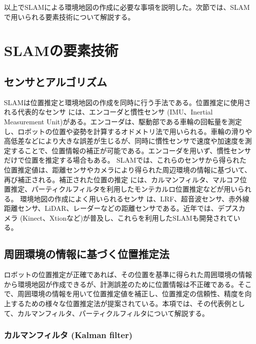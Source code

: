 以上でSLAMによる環境地図の作成に必要な事項を説明した。次節では、SLAMで用いられる要素技術について解説する。

\section{SLAMの要素技術}

\subsection{センサとアルゴリズム}

SLAMは位置推定と環境地図の作成を同時に行う手法である。位置推定に使用される代表的なセンサ  には、エンコーダと慣性センサ (IMU、Inertial Measurement Unit)がある。エンコーダは、駆動部である車輪の回転量を測定し、ロボットの位置や姿勢を計算するオドメトリ法で用いられる。車輪の滑りや高低差などにより大きな誤差が生じるが、同時に慣性センサで速度や加速度を測定することで、位置情報の補正が可能である。エンコーダを用いず、慣性センサだけで位置を推定する場合もある。
SLAMでは、これらのセンサから得られた位置推定値は、距離センサやカメラにより得られた周辺環境の情報に基づいて、再び補正される。補正された位置の推定  には、カルマンフィルタ、マルコフ位置推定、パーティクルフィルタを利用したモンテカルロ位置推定などが用いられる。
環境地図の作成によく用いられるセンサ  は、LRF、超音波センサ、赤外線距離センサ、LiDAR、レーダーなどの距離センサである。近年では、デプスカメラ (Kinect、Xtionなど)が普及し、これらを利用したSLAMも開発されている。

\subsection{周囲環境の情報に基づく位置推定法}

ロボットの位置推定が正確であれば、その位置を基準に得られた周囲環境の情報から環境地図が作成できるが、計測誤差のために位置情報は不正確である。そこで、周囲環境の情報を用いて位置推定値を補正し、位置推定の信頼性、精度を向上するための様々な位置推定法が提案されている。本項では、その代表例として、カルマンフィルタ、パーティクルフィルタについて解説する。

\subsubsection{カルマンフィルタ (Kalman filter)}

